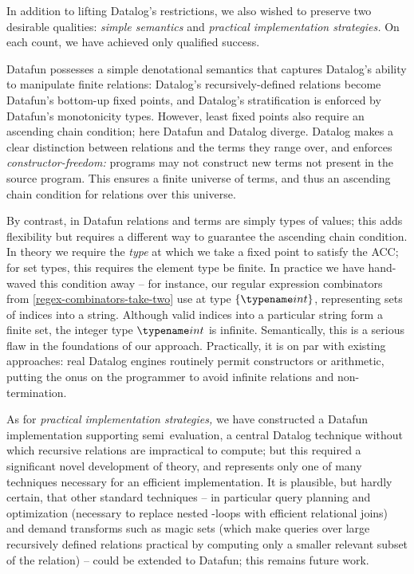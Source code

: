 In addition to lifting Datalog's restrictions, we also wished to preserve two
desirable qualities: \emph{simple semantics} and \emph{practical implementation
strategies.} On each count, we have achieved only qualified success.

Datafun possesses a simple denotational semantics that captures Datalog's
ability to manipulate finite relations: Datalog's recursively-defined relations
become Datafun's bottom-up fixed points, and Datalog's stratification is
enforced by Datafun's monotonicity types.
%
However, least fixed points also require an ascending chain
condition; here Datafun and Datalog diverge.
%
Datalog makes a clear distinction between relations and the terms they range over, and enforces \emph{constructor-freedom:} programs may not construct new terms not present in the source program. This ensures a finite universe of terms, and thus an ascending chain condition for relations over this universe.

By contrast, in Datafun relations and terms are simply types of values; this
adds flexibility but requires a different way to guarantee the ascending chain condition.
%
In theory we require the \emph{type} at which we take a fixed point to satisfy the ACC; for set types, this requires the element type be finite.
%
In practice we have hand-waved this condition away -- for instance, our regular
expression combinators from \cref{regex-combinators-take-two} use  at
type $\tset{\tint}$, representing sets of indices into a string. Although valid
indices into a particular string form a finite set, the integer type $\tint$ is
infinite.
%
Semantically, this is a serious flaw in the foundations of our approach.
%
Practically, it is on par with existing approaches: real Datalog engines routinely permit constructors or arithmetic, putting the onus on the programmer to avoid infinite relations and non-termination.


As for \emph{practical implementation strategies,} we have constructed a Datafun
implementation supporting semi\naive\ evaluation, a central Datalog technique
without which recursive relations are impractical to compute; but this required
a significant novel development of theory, and represents only one of many
techniques necessary for an efficient implementation. It is plausible, but
hardly certain, that other standard techniques -- in particular query planning
and optimization (necessary to replace nested -loops with efficient
relational joins) and demand transforms such as magic sets (which make queries
over large recursively defined relations practical by computing only a smaller
relevant subset of the relation) -- could be extended to Datafun; this remains
future work.

